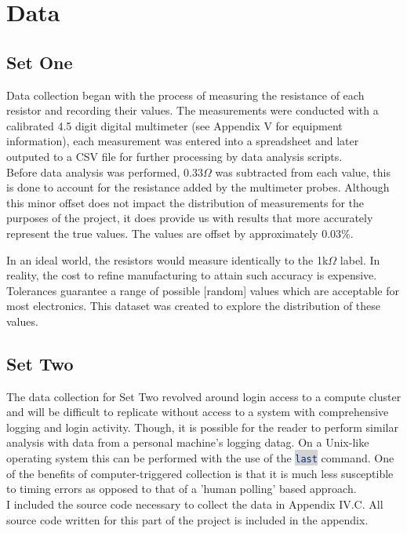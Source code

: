 \documentclass[10pt]{report}
\newcommand{\inlinecode}[2]{\colorbox{lightgray}{\lstinline[language=#1]$#2$}}
\begin{document}
\section*{Data}

\subsection*{Set One}

Data collection began with the process of measuring the resistance of each resistor
and recording their values. The measurements were conducted with a calibrated 4.5 digit
digital multimeter (see Appendix V for equipment information), each measurement was entered
into a spreadsheet and later outputed to a CSV file for further processing by data analysis scripts. \\
Before data analysis was performed, $0.33\Omega$ was subtracted from each value, this is done to account
for the resistance added by the multimeter probes. Although this minor offset does not impact the
distribution of measurements for the purposes of the project, it does provide us with results that more 
accurately represent the true values. The values are offset by approximately 0.03\%.

In an ideal world, the resistors would measure identically to the 1k$\Omega$ label.
In reality, the cost to refine manufacturing to attain such accuracy is expensive.
Tolerances guarantee a range of possible [random] values which are acceptable for most 
electronics. This dataset was created to explore the distribution of these values.

\subsection*{Set Two}

The data collection for Set Two revolved around login access to a compute cluster
and will be difficult to replicate without access to a system with comprehensive logging and login activity.
Though, it is possible for the reader to perform similar analysis with data from a personal machine's logging datag. 
On a Unix-like operating system this can be performed with the use of the \inlinecode{Bash}{last} command. 
One of the benefits of computer-triggered collection is that it is much less susceptible to timing errors 
as opposed to that of a 'human polling' based approach. \\ I included the source code necessary to collect 
the data in Appendix IV.C. All source code written for this part of the project is included in the appendix.
\end{document}
